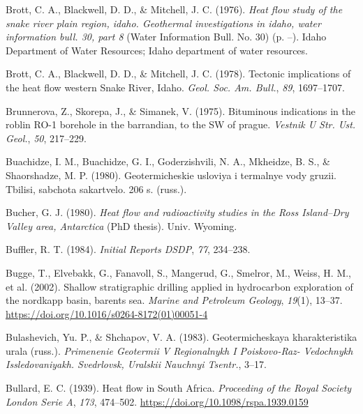 \documentclass[draft,linenumbers]{agujournal2018}
\begin{document}
\leavevmode{}%
Brott, C. A., Blackwell, D. D., \& Mitchell, J. C. (1976). \emph{Heat
flow study of the snake river plain region, idaho. Geothermal
investigations in idaho, water information bull. 30, part 8} (Water
Information Bull. No. 30) (p. --). Idaho Department of Water Resources;
Idaho department of water resources.

\leavevmode{}%
Brott, C. A., Blackwell, D. D., \& Mitchell, J. C. (1978). Tectonic
implications of the heat flow western {Snake River, Idaho}. \emph{Geol.
Soc. Am. Bull.}, \emph{89}, 1697--1707.

\leavevmode{}%
Brunnerova, Z., Skorepa, J., \& Simanek, V. (1975). Bituminous
indications in the roblin RO-1 borehole in the barrandian, to the SW of
prague. \emph{Vestnik U Str. Ust. Geol.}, \emph{50}, 217--229.

\leavevmode{}%
Buachidze, I. M., Buachidze, G. I., Goderzishvili, N. A., Mkheidze, B.
S., \& Shaorshadze, M. P. (1980). Geotermicheskie usloviya i termalnye
vody gruzii. Tbilisi, sabchota sakartvelo. 206 s. (russ.).

\leavevmode{}%
Bucher, G. J. (1980). \emph{Heat flow and radioactivity studies in the
{Ross Island--Dry Valley} area, {Antarctica}} (PhD thesis). Univ.
Wyoming.

\leavevmode{}%
Buffler, R. T. (1984). \emph{Initial Reports DSDP}, \emph{77}, 234--238.

\leavevmode{}%
Bugge, T., Elvebakk, G., Fanavoll, S., Mangerud, G., Smelror, M., Weiss,
H. M., et al. (2002). Shallow stratigraphic drilling applied in
hydrocarbon exploration of the nordkapp basin, barents sea. \emph{Marine
and Petroleum Geology}, \emph{19}(1), 13--37.
\url{https://doi.org/10.1016/s0264-8172(01)00051-4}

\leavevmode{}%
Bulashevich, Yu. P., \& Shchapov, V. A. (1983). Geotermicheskaya
kharakteristika urala (russ.). \emph{Primenenie Geotermii V Regionalnykh
I Poiskovo-Raz- Vedochnykh Issledovaniyakh. Svedrlovsk, Uralskii
Nauchnyi Tsentr.}, 3--17.

\leavevmode{}%
Bullard, E. C. (1939). Heat flow in {South Africa}. \emph{Proceeding of
the Royal Society London Serie A}, \emph{173}, 474--502.
\url{https://doi.org/10.1098/rspa.1939.0159}
\end{document}
